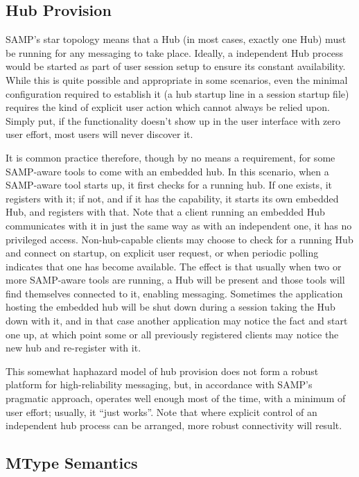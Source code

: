 \documentclass[5p]{elsarticle}
\begin{document}
\subsection{Hub Provision} \label{sec:hubProvision}

SAMP's star topology means that a Hub (in most cases, exactly one Hub)
must be running for any messaging to take place.
Ideally, a independent Hub process would be started
as part of user session setup to ensure its constant availability.
While this is quite possible and appropriate in some scenarios,
even the minimal configuration required to establish it
(a hub startup line in a session startup file)
requires the kind of explicit user action which cannot always be relied upon.
Simply put, if the functionality doesn't show up in the user interface
with zero user effort, most users will never discover it.

It is common practice therefore, though by no means a requirement,
for some SAMP-aware tools to come with an embedded hub.
In this scenario, when a SAMP-aware tool starts up, it first checks for
a running hub.
If one exists, it registers with it;
if not, and if it has the capability, it starts its own embedded Hub,
and registers with that.
Note that a client running an embedded Hub communicates with it in
just the same way as with an independent one, it has no privileged access.
Non-hub-capable clients may choose to check for a running Hub and connect
on startup, on explicit user request, or when periodic polling indicates
that one has become available.
The effect is that usually when two or more SAMP-aware tools are running,
a Hub will be present and those tools will find themselves connected to it,
enabling messaging.
Sometimes the application hosting the embedded hub will be shut down
during a session taking the Hub down with it,
and in that case another application may notice the fact and start one up,
at which point some or all previously registered clients may notice
the new hub and re-register with it.

This somewhat haphazard model of hub provision does not form a
robust platform for high-reliability messaging,
but, in accordance with SAMP's pragmatic approach,
operates well enough most of the time, with a minimum of user effort;
usually, it ``just works''.
Note that where explicit control of an independent hub process
can be arranged, more robust connectivity will result.

\subsection{MType Semantics} \label{sec:messageSemantics}
\end{document}
